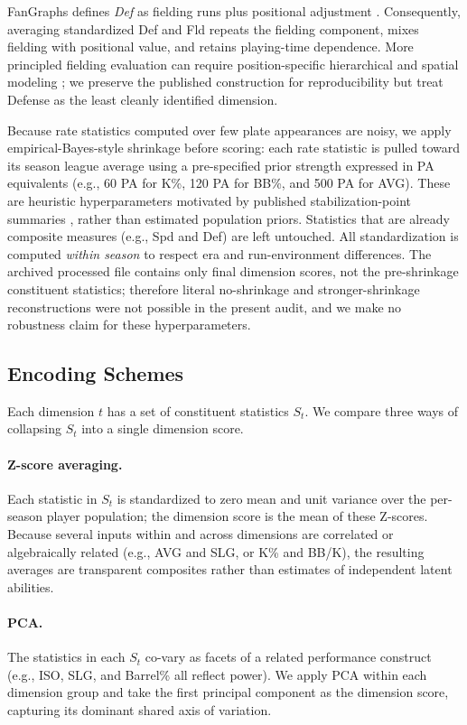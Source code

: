 \documentclass[10pt,twocolumn,letterpaper]{article}
\begin{document}
FanGraphs defines \emph{Def} as fielding runs plus positional adjustment \cite{fangraphsDef}. Consequently, averaging standardized Def and Fld repeats the fielding component, mixes fielding with positional value, and retains playing-time dependence. More principled fielding evaluation can require position-specific hierarchical and spatial modeling \cite{jensen2009}; we preserve the published construction for reproducibility but treat Defense as the least cleanly identified dimension.

Because rate statistics computed over few plate appearances are noisy, we apply empirical-Bayes-style shrinkage before scoring: each rate statistic is pulled toward its season league average using a pre-specified prior strength expressed in PA equivalents (e.g., 60 PA for K\%, 120 PA for BB\%, and 500 PA for AVG). These are heuristic hyperparameters motivated by published stabilization-point summaries \cite{fangraphsSampleSize}, rather than estimated population priors. Statistics that are already composite measures (e.g., Spd and Def) are left untouched. All standardization is computed \emph{within season} to respect era and run-environment differences. The archived processed file contains only final dimension scores, not the pre-shrinkage constituent statistics; therefore literal no-shrinkage and stronger-shrinkage reconstructions were not possible in the present audit, and we make no robustness claim for these hyperparameters.

\subsection{Encoding Schemes}
Each dimension $t$ has a set of constituent statistics $S_t$. We compare three ways of collapsing $S_t$ into a single dimension score.

\paragraph{Z-score averaging.}
Each statistic in $S_t$ is standardized to zero mean and unit variance over the per-season player population; the dimension score is the mean of these Z-scores. Because several inputs within and across dimensions are correlated or algebraically related (e.g., AVG and SLG, or K\% and BB/K), the resulting averages are transparent composites rather than estimates of independent latent abilities.

\paragraph{PCA.}
The statistics in each $S_t$ co-vary as facets of a related performance construct (e.g., ISO, SLG, and Barrel\% all reflect power). We apply PCA within each dimension group and take the first principal component as the dimension score, capturing its dominant shared axis of variation.
\end{document}
